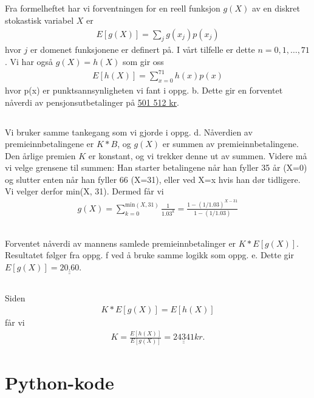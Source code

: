 \documentclass[a4paper,10pt, norsk]{article}
\begin{document}
\subsection{}
Fra formelheftet har vi forventningen for en reell funksjon $g(X)$ av en diskret stokastisk variabel $X$ er
\begin{align}
    E[g(X)] = \sum_j g(x_j)p(x_j)
\end{align}
hvor $j$ er domenet funksjonene er definert på. I vårt tilfelle er dette $n=0,1,\ldots, 71$. Vi har også $g(X)=h(X)$ som gir oss
\begin{align*}
    E[h(X)] = \sum_{x=0}^{71} h(x) p(x)
\end{align*}
hvor p(x) er punktsannsynligheten vi fant i oppg. b. Dette gir en forventet nåverdi av pensjonsutbetalinger på \underline{\underline{501 512 kr}}.

\subsection{}
Vi bruker samme tankegang som vi gjorde i oppg. d. Nåverdien av premieinnbetalingene er $K*B$, og $g(X)$ er summen av premieinnbetalingene. Den årlige premien $K$ er konstant, og vi trekker denne ut av summen. Videre må vi velge grensene til summen: Han starter betalingene når han fyller 35 år (X=0) og slutter enten når han fyller 66 (X=31), eller ved X=x hvis han dør tidligere. Vi velger derfor min(X, 31). Dermed får vi
\begin{align*}
    g(X) 
    = \sum_{k=0}^{\text{min}(X, 31)} \frac{1}{1.03^k} 
    = \frac{1-(1/1.03)^{X-31}}{1-(1/1.03)} 
\end{align*}

\subsection{}
Forventet nåverdi av mannens samlede premieinnbetalinger er $K*E[g(X)]$. Resultatet følger fra oppg. f ved å bruke samme logikk som oppg. e. Dette gir $E[g(X)] = \underline{\underline{20.60}}$.

\subsection{}
Siden
\begin{align*}
    K * E[g(X)] = E[h(X)]
\end{align*}
får vi
\begin{align*}
    K 
    = \frac{E[h(X)]}{E[g(X)]} 
    = \underline{\underline{24 341}}kr.
\end{align*}

\newpage
\section{Python-kode} \label{kode}

\end{document}
